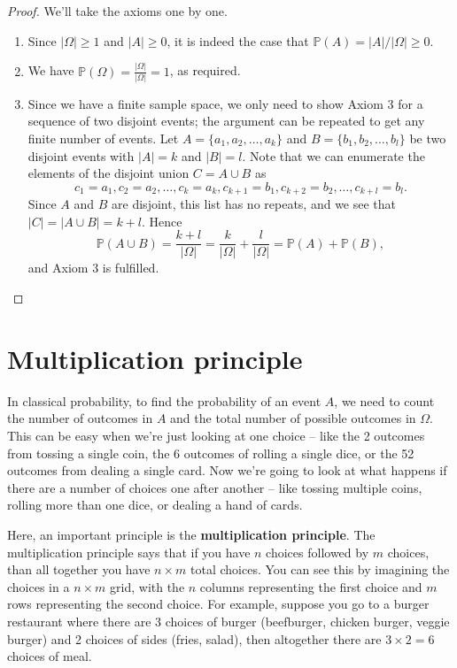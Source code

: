\documentclass[
  a4paper,
]{book}
\providecommand{\tightlist}{%
  \setlength{\itemsep}{0pt}\setlength{\parskip}{0pt}}
\theoremstyle{definition}
\theoremstyle{definition}
\theoremstyle{definition}
\theoremstyle{definition}
\theoremstyle{remark}
\begin{document}
\begin{proof}

We'll take the axioms one by one.

\begin{enumerate}
\def\labelenumi{\arabic{enumi}.}
\tightlist
\item
  Since \(|\Omega| \geq 1\) and \(|A| \geq 0\), it is indeed the case that \(\mathbb P(A) = |A|/|\Omega| \geq 0\).
\item
  We have \({\displaystyle \mathbb P(\Omega) = \frac{|\Omega|}{|\Omega|} = 1}\), as required.
\item
  Since we have a finite sample space, we only need to show Axiom 3 for a sequence of two disjoint events; the argument can be repeated to get any finite number of events. Let \(A = \{a_1, a_2, \dots, a_k\}\) and \(B = \{b_1, b_2, \dots, b_l\}\) be two disjoint events with \(|A| = k\) and \(|B| = l\). Note that we can enumerate the elements of the disjoint union \(C = A \cup B\) as
  \[ c_1 = a_1, c_2 = a_2, \dots, c_k = a_k, c_{k+1} = b_1, c_{k+2} = b_2, \dots, c_{k+l} = b_l . \]
  Since \(A\) and \(B\) are disjoint, this list has no repeats, and we see that \(|C| = |A \cup B| = k+l\). Hence
  \[ \mathbb P(A \cup B) = \frac{k+l}{|\Omega|} = \frac{k}{|\Omega|} + \frac{l}{|\Omega|} = \mathbb P(A) + \mathbb P(B) , \]
  and Axiom 3 is fulfilled.
\end{enumerate}

\end{proof}

\hypertarget{multiplication}{%
\section{Multiplication principle}\label{multiplication}}

In classical probability, to find the probability of an event \(A\), we need to count the number of outcomes in \(A\) and the total number of possible outcomes in \(\Omega\). This can be easy when we're just looking at one choice -- like the 2 outcomes from tossing a single coin, the 6 outcomes of rolling a single dice, or the 52 outcomes from dealing a single card. Now we're going to look at what happens if there are a number of choices one after another -- like tossing multiple coins, rolling more than one dice, or dealing a hand of cards.

Here, an important principle is the \textbf{multiplication principle}. The multiplication principle says that if you have \(n\) choices followed by \(m\) choices, than all together you have \(n \times m\) total choices. You can see this by imagining the choices in a \(n \times m\) grid, with the \(n\) columns representing the first choice and \(m\) rows representing the second choice. For example, suppose you go to a burger restaurant where there are 3 choices of burger (beefburger, chicken burger, veggie burger) and 2 choices of sides (fries, salad), then altogether there are \(3 \times 2 = 6\) choices of meal.
\end{document}
